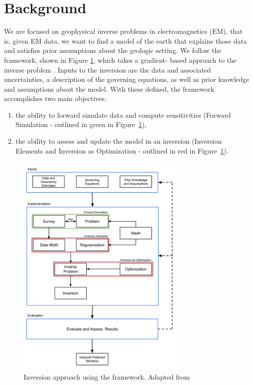 \section{Background}
\label{sec:Background}

We are focused on geophysical inverse problems in electromagnetics (EM), that
is, given EM data, we want to find a model of the earth that explains those
data and satisfies prior assumptions about the geologic setting. We follow the
\SimPEG framework, shown in Figure \ref{fig:SimPEG}, which takes a gradient-
based approach to the inverse problem \citep{Cockett2015}. Inputs to the
inversion are the data and associated uncertainties, a description of the
governing equations, as well as prior knowledge and assumptions about the
model. With these defined, the \SimPEG framework accomplishes two main
objectives:
\begin{enumerate}
\item the ability to forward simulate data and compute sensitivities (Forward Simulation - outlined in green in Figure~\ref{fig:SimPEG}),
\item the ability to assess and update the model in an inversion (Inversion Elements and Inversion as Optimization - outlined in red in Figure~\ref{fig:SimPEG}).
\end{enumerate}


{%
\begin{figure}[htb!]
    \centering
    \includegraphics[width=0.75\textwidth]{images/SimPEGInversion}
\caption{Inversion approach using the \SimPEG framework. Adapted from \cite{Cockett2015}}
\label{fig:SimPEG}
\end{figure}
}

